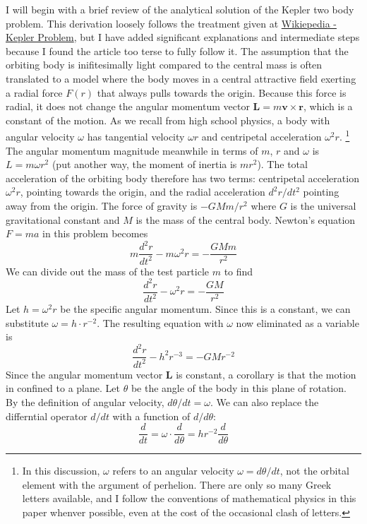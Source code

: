 I will begin with a brief review of the analytical solution of the Kepler two body problem.
This derivation loosely follows the treatment given at \href{https://en.wikipedia.org/wiki/Kepler_problem}{Wikiepedia - Kepler Problem},
but I have added significant explanations and intermediate steps because I found the article too terse to fully follow it.
The assumption that the orbiting body is inifitesimally light compared to the central mass is often translated to a model 
where the body moves in a central attractive field exerting a radial force $F(r)$ that always pulls towards the origin.
Because this force is radial, it does not change the angular momentum vector $\mathbf{L} = m\mathbf{v} \times \mathbf{r}$, 
which is a constant of the motion.
As we recall from high school physics, a body with angular velocity $\omega$ has tangential velocity $\omega r$
and centripetal acceleration $\omega^2 r$.
\footnote{
In this discussion, $\omega$ refers to an angular velocity $\omega = d\theta / dt$, not the orbital element with the argument of perhelion.
There are only so many Greek letters available, and I follow the conventions of mathematical physics in this paper whenver possible,
even at the cost of the occasional clash of letters.}
The angular momentum magnitude meanwhile in terms of $m$, $r$ and $\omega$ is $L = m \omega r^2$ 
(put another way, the moment of inertia is $mr^2$).
The total acceleration of the orbiting body therefore has two terms: centripetal acceleration $\omega^2r$, pointing towards the origin,
and the radial acceleration $d^2r / dt^2$ pointing away from the origin.
The force of gravity is $-G M m / r^2$ where $G$ is the universal gravitational constant and $M$ is the mass of the central body.
Newton's equation $F = ma$ in this problem becomes
$$ m \frac{d^2r}{dt^2} - m \omega^2 r = - \frac{G M m }{r^2}$$
We can divide out the mass of the test particle $m$ to find
$$ \frac{d^2r}{dt^2} - \omega^2 r = - \frac{G M }{r^2}$$
Let $h = \omega^2 r$ be the specific angular momentum.
Since this is a constant, we can substitute $\omega = h\cdot r^{-2}$.  
The resulting equation with $\omega$ now eliminated as a variable is
$$ \frac{d^2r}{dt^2} - h^2 r^{-3} = - G Mr^{-2}$$
Since the angular momentum vector $\mathbf{L}$ is constant, a corollary is that the motion in confined to a plane.
Let $\theta$ be the angle of the body in this plane of rotation.
By the definition of angular velocity, $d\theta / dt = \omega$.
We can also replace the differntial operator $d / dt$ with a function of $d / d\theta$:
$$\frac{d}{dt} = \omega \cdot \frac{d}{d\theta} = h r^{-2} \frac{d}{d\theta}$$
